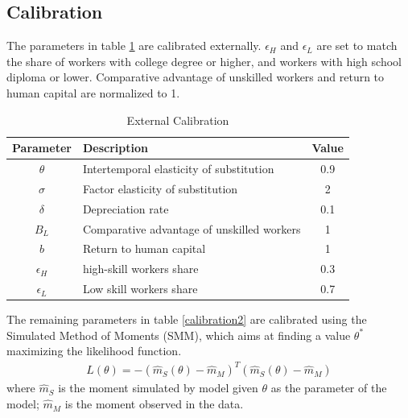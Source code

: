 \documentclass[12pt]{article}
\begin{document}
\subsection{Calibration}
The parameters in table \ref{calibration1} are calibrated externally. $\epsilon_H$ and $\epsilon_L$ are set to match the share of workers with college degree or higher, and workers with high school diploma or lower. Comparative advantage of unskilled workers and return to human capital are normalized to 1. 
\begin{table}[h!]
\center
\caption{External Calibration}
\label{calibration1}
\begin{tabular}{clc}
\hline \hline
Parameter & Description      & Value   \\ \hline 
$\theta$    & Intertemporal elasticity of substitution        &  0.9    \\
$\sigma$    & Factor elasticity of substitution        &  2    \\
$\delta$    & Depreciation rate       &  0.1    \\
$B_L$ & Comparative advantage of unskilled workers   &     1  \\
$b$ & Return to human capital   &     1  \\
$\epsilon_H$    & high-skill workers share   &  0.3    \\
$\epsilon_L$     & Low skill workers share     &  0.7  \\
\hline
\end{tabular}
\end{table}

The remaining parameters in table \ref{calibration2} are calibrated using the Simulated Method of Moments (SMM), which aims at finding a value $\theta^*$ maximizing the likelihood function. 
\begin{align*}
L(\theta) = -(\hat{m}_S(\theta)-\hat{m}_M)^T(\hat{m}_S(\theta)-\hat{m}_M)
\end{align*}
where $\hat{m}_S$ is the moment simulated by model given $\theta$ as the parameter of the model; $\hat{m}_M$ is the moment observed in the data.
\end{document}
